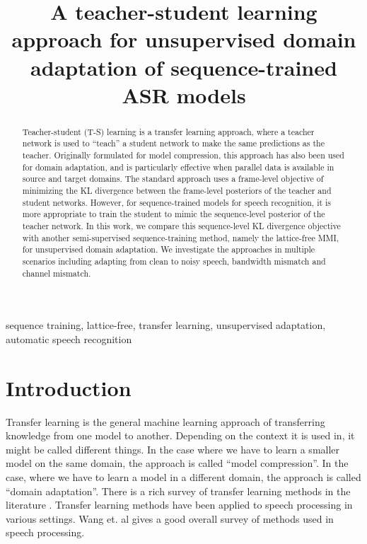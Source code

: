 \documentclass{article}
\title{A teacher-student learning approach for unsupervised domain adaptation of sequence-trained ASR models}
\begin{document}
%
\maketitle
%
\begin{abstract}
Teacher-student (T-S) learning is a transfer learning approach, where a teacher 
network is used to ``teach'' a student network to make the
same predictions as the teacher. Originally formulated for model compression,
this approach has also been used for domain adaptation, and is particularly
effective when parallel data is available in source and target domains.
The standard approach uses a frame-level objective of minimizing the KL
divergence between the frame-level posteriors of the teacher
and student networks. However, for sequence-trained models for speech
recognition, it is more appropriate to train the student to mimic the
sequence-level posterior of the teacher network. In this work, we compare this
sequence-level KL divergence objective with another semi-supervised
sequence-training method, namely the lattice-free MMI, for unsupervised
domain adaptation. We investigate the approaches in multiple scenarios
including adapting from clean to noisy speech, bandwidth mismatch and
channel mismatch.
\end{abstract}
%
\begin{keywords}
sequence training, lattice-free, transfer learning, unsupervised adaptation,
automatic speech recognition
\end{keywords}
%
\section{Introduction}
\label{sec:intro}

Transfer learning is the general machine learning approach of transferring
knowledge from one model to another. Depending on the context it is used in,
it might be called different things.
In the case where we have to learn
a smaller model on the same domain, the approach is called ``model
compression''.
In the case, where we have to learn a model
in a different domain, the approach is called ``domain adaptation''.
There is a rich survey of transfer learning methods in the
literature \cite{pan2010survey,lu2015transfer,bengio2012deep}.
Transfer learning methods have been applied to speech processing in various
settings. Wang et. al \cite{wang2015transfer} gives a good overall survey of
methods used in speech processing.
\end{document}
